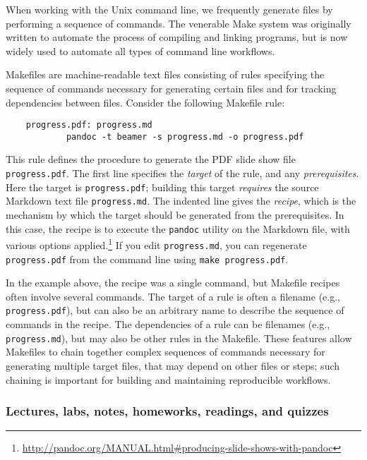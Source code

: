 When working with the Unix command line, we frequently generate files
by performing a sequence of commands.
The venerable Make system was originally written to automate the process
of compiling and linking programs, but is now widely used to
automate all types of command line workflows.

Makefiles are machine-readable text files consisting of rules
specifying the sequence of commands necessary for generating
certain files and for tracking dependencies between files.
Consider the following Makefile rule:
\begin{verbatim}
    progress.pdf: progress.md
            pandoc -t beamer -s progress.md -o progress.pdf
\end{verbatim}
This rule defines the procedure to generate the PDF slide show file
\texttt{progress.pdf}. The first line specifies the \textit{target} of the
rule, and any \textit{prerequisites}.  Here the target is
\texttt{progress.pdf}; building this target \textit{requires} the source
Markdown text file \texttt{progress.md}. The indented line gives the
\textit{recipe}, which is the mechanism by which the target
should be generated from the prerequisites.  In this case, the recipe is to
execute the \texttt{pandoc} utility on the Markdown file, with various options
applied.\footnote{\url{http://pandoc.org/MANUAL.html\#producing-slide-shows-with-pandoc}}
If you edit \texttt{progress.md}, you can regenerate \texttt{progress.pdf}
from the command line using \texttt{make progress.pdf}.

In the example above, the recipe was a single command, but Makefile recipes
often involve several commands.  The target of a rule is often a filename
(e.g., \texttt{progress.pdf}), but can also be an arbitrary name to describe
the sequence of commands in the recipe.  The dependencies of a rule can be
filenames (e.g., \texttt{progress.md}), but may also be other rules in the
Makefile.  These features allow Makefiles to chain together complex sequences
of commands necessary for generating multiple target files, that may depend on
other files or steps; such chaining is important for building and maintaining
reproducible workflows.

\subsubsection{Lectures, labs, notes, homeworks, readings, and quizzes}

